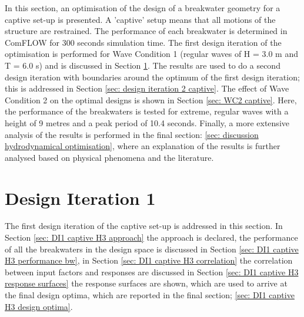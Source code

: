 In this section, an optimisation of the design of a breakwater geometry for a captive set-up is presented. A 'captive' setup means that all motions of the structure are restrained. The performance of each breakwater is determined in ComFLOW for 300 seconds simulation time. The first design iteration of the optimisation is performed for Wave Condition 1 (regular waves of H = 3.0 m and T = 6.0 s) and is discussed in Section \ref{sec: design iteration 1 captive}. The results are used to do a second design iteration with boundaries around the optimum of the first design iteration; this is addressed in Section \ref{sec: design iteration 2 captive}. The effect of Wave Condition 2 on the optimal designs is shown in Section \ref{sec: WC2 captive}. Here, the performance of the breakwaters is tested for extreme, regular waves with a height of 9 metres and a peak period of 10.4 seconds. Finally, a more extensive analysis of the results is performed in the final section: \ref{sec: discussion hydrodynamical optimisation}, where an explanation of the results is further analysed based on physical phenomena and the literature. 






\section{Design Iteration 1}
\label{sec: design iteration 1 captive}

The first design iteration of the captive set-up is addressed in this section. In Section \ref{sec: DI1 captive H3 approach} the approach is declared, the performance of all the breakwaters in the design space is discussed in Section \ref{sec: DI1 captive H3 performance bw}, in Section \ref{sec: DI1 captive H3 correlation} the correlation between input factors and responses are discussed in Section \ref{sec: DI1 captive H3 response surfaces} the response surfaces are shown, which are used to arrive at the final design optima, which are reported in the final section; \ref{sec: DI1 captive H3 design optima}.


